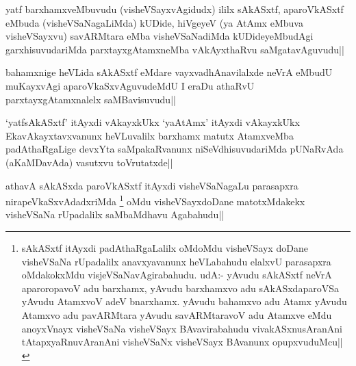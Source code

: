 \begin{artha}
yatf barxhamxveMbuvudu (visheVSayxvAgidudx) ililx sAkASxtf, aparoVkASxtf eMbuda (visheVSaNagaLiMda) kUDide, hiVgeyeV
(ya AtAmx eMbuva visheVSayxvu) savARMtara eMba visheVSaNadiMda kUDideyeMbudAgi garxhisuvudariMda parxtayxgAtamxneMba vAkAyxthaRvu saMgatavAguvudu|| 
\end{artha}


\begin{artha}
bahamxnige heVLida sAkASxtf eMdare vayxvadhAnavilalxde neVrA eMbudU muKayxvAgi aparoVkaSxvAguvudeMdU I eraDu athaRvU parxtayxgAtamxnalelx saMBavisuvudu||
\end{artha}%

\begin{artha}
`yatfsAkASxtf' itAyxdi vAkayxkUkx `yaAtAmx' itAyxdi vAkayxkUkx EkavAkayxtavxvanunx heVLuvalilx barxhamx 
matutx AtamxveMba padAthaRgaLige devxYta saMpakaRvanunx niSeVdhisuvudariMda pUNaRvAda (aKaMDavAda) vasutxvu 
toVrutatxde||
\end{artha}


\begin{artha}
athavA  sAkASxda paroVkASxtf itAyxdi visheVSaNagaLu parasapxra nirapeVkaSxvAdadxriMda \footnote{sAkASxtf itAyxdi padAthaRgaLalilx oMdoMdu visheVSayx doDane visheVSaNa rUpadalilx anavxyavanunx heVLabahudu elalxvU parasapxra oMdakokxMdu visjeVSaNavAgirabahudu. udA:- yAvudu sAkASxtf neVrA aparoropavoV adu barxhamx, yAvudu barxhamxvo adu sAkASxdaparoVSa yAvudu AtamxvoV adeV bnarxhamx. yAvudu bahamxvo adu Atamx yAvudu Atamxvo adu pavARMtara yAvudu savARMtaravoV adu Atamxve eMdu anoyxVnayx visheVSaNa visheVSayx BAvavirabahudu vivakASxnusAranAni tAtapxyaRnuvAranAni visheVSaNx visheVSayx BAvanunx opupxvuduMcu||} oMdu visheVSayxdoDane matotxMdakekx visheVSaNa rUpadalilx saMbaMdhavu Agabahudu||
\end{artha}
